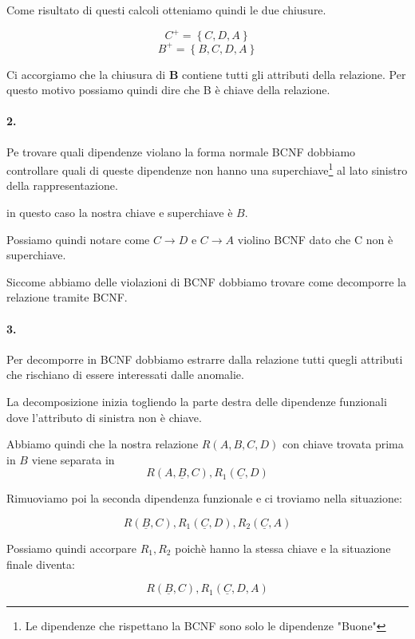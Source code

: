 \begin{exmp}
    Come risultato di questi calcoli otteniamo quindi le due chiusure.

    \[C^+= \left\{ C,D,A \right\} \] \[ B^+= \left\{  B,C,D,A \right\}\]

    Ci accorgiamo che la chiusura di \textbf{B} contiene tutti gli attributi della relazione. Per questo motivo possiamo quindi dire che B è chiave della relazione.

    \paragraph{2.}

    Pe trovare quali dipendenze violano la forma normale BCNF dobbiamo controllare quali di queste dipendenze non hanno una superchiave\footnote{Le dipendenze che rispettano la BCNF sono solo le dipendenze "Buone"} al lato sinistro della rappresentazione.

    in questo caso la nostra chiave e superchiave è $B$. 

    Possiamo quindi notare come $C \rightarrow D$ e $C \rightarrow A$ violino BCNF dato che C non è superchiave.

    Siccome abbiamo delle violazioni di BCNF dobbiamo trovare come decomporre la relazione tramite BCNF.

    \paragraph{3.} Per decomporre in BCNF dobbiamo estrarre dalla relazione tutti quegli attributi che rischiano di essere interessati dalle anomalie.

    La decomposizione inizia togliendo la parte destra delle dipendenze funzionali dove l'attributo di sinistra non è chiave.

    Abbiamo quindi che la nostra relazione $R(A,B,C,D)$ con chiave trovata prima in $B$ viene separata in
    \[R(A,\underline{B},C) , R_1(\underline{C},D)\]

    Rimuoviamo poi la seconda dipendenza funzionale e ci troviamo nella situazione:

    \[R(\underline{B},C) , R_1(\underline{C},D), R_2(\underline{C},A)\]

    Possiamo quindi accorpare $R_1,R_2$ poichè hanno la stessa chiave e la situazione finale diventa:

    \[R(\underline{B},C), R_1(\underline{C},D,A)\]

\end{exmp}

